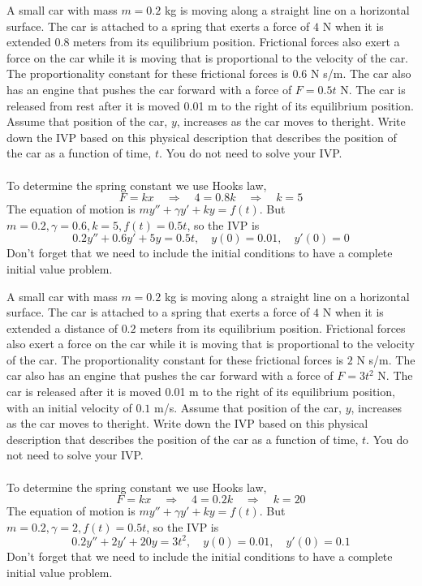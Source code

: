 \ifnum {}
\question[2] A small car with mass $m = 0.2$ kg is moving along a straight line on a horizontal surface. The car is attached to a spring that exerts a force of $4$ N when it is extended $0.8$ meters from its equilibrium position. Frictional forces also exert a force on the car while it is moving that is proportional to the velocity of the car. The proportionality constant for these frictional forces is $0.6$ N s/m. The car also has an engine that pushes the car forward with a force of $F = 0.5t$ N. The car is released from rest after it is moved 0.01 m to the right of its equilibrium position. Assume that position of the car, $y$, increases as the car moves to theright. Write down the IVP based on this physical description that describes the position of the car as a function of time, $t$. You do not need to solve your IVP. \\[4pt]

\ifnum {} {\color{DarkBlue} \\[12pt] 
To determine the spring constant we use Hooks law, 
$$F = kx \quad \Rightarrow \quad 4 = 0.8k \quad \Rightarrow \quad k = 5$$
The equation of motion is $my''+\gamma y' + ky = f(t)$.
But $m=0.2, \gamma = 0.6, k = 5, f(t) = 0.5t$, so the IVP is
$$0.2y'' + 0.6 y' + 5y = 0.5t, \quad y(0) = 0.01, \quad y'(0) = 0$$
Don't forget that we need to include the initial conditions to have a complete initial value problem.
} 
\else 
\vspace{0.5cm}
\fi
\fi 



\ifnum {}
\question[2] A small car with mass $m = 0.2$ kg is moving along a straight line on a horizontal surface. The car is attached to a spring that exerts a force of $4$ N when it is extended a distance of $0.2$ meters from its equilibrium position. Frictional forces also exert a force on the car while it is moving that is proportional to the velocity of the car. The proportionality constant for these frictional forces is $2$ N s/m. The car also has an engine that pushes the car forward with a force of $F = 3t^2$ N. The car is released after it is moved 0.01 m to the right of its equilibrium position, with an initial velocity of $0.1$ m/s. Assume that position of the car, $y$, increases as the car moves to theright. Write down the IVP based on this physical description that describes the position of the car as a function of time, $t$. You do not need to solve your IVP. \\

\ifnum {} {\color{DarkBlue} \\[12pt] 
To determine the spring constant we use Hooks law, 
$$F = kx \quad \Rightarrow \quad 4 = 0.2k \quad \Rightarrow \quad k = 20$$
The equation of motion is $my''+\gamma y' + ky = f(t)$.
But $m=0.2, \gamma = 2, f(t) = 0.5t$, so the IVP is
$$0.2y'' + 2 y' + 20y = 3t^2, \quad y(0) = 0.01, \quad y'(0) = 0.1$$
Don't forget that we need to include the initial conditions to have a complete initial value problem.
} 
\else 
\vfill
\fi
\fi 




